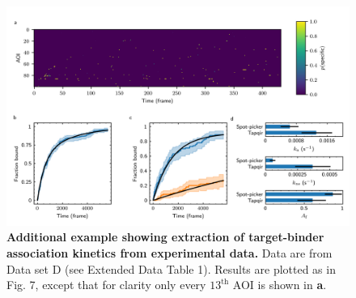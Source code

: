 \begin{figure}[t]
\centering
\includegraphics[width=\textwidth]{extended-data/figure6.png}
\caption{\textbf{Additional example showing extraction of target-binder association kinetics from experimental data.} Data are from Data set D (see Extended Data Table 1).  Results are plotted as in Fig. 7, except that for clarity only every $13^\mathrm{th}$ AOI is shown in \textbf{a}.}
\label{fig:greb}
\end{figure}
\clearpage
\pagebreak

